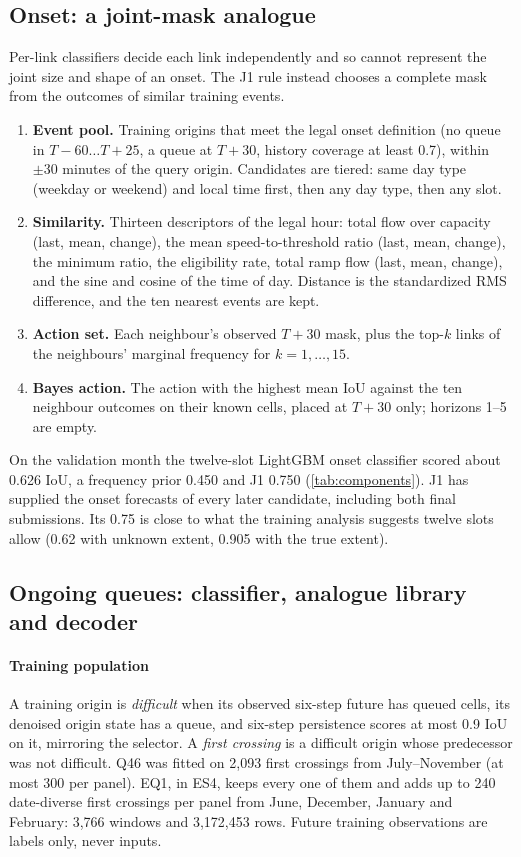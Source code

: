 \subsection{Onset: a joint-mask analogue}\label{sec:onset}
Per-link classifiers decide each link independently and so cannot represent the joint size and shape of an onset.
The J1 rule instead chooses a complete mask from the outcomes of similar training events.
\begin{enumerate}
  \item \textbf{Event pool.} Training origins that meet the legal onset definition (no queue in $T{-}60\dots T{+}25$,
        a queue at $T{+}30$, history coverage at least 0.7), within $\pm30$ minutes of the query origin. Candidates are
        tiered: same day type (weekday or weekend) and local time first, then any day type, then any slot.
  \item \textbf{Similarity.} Thirteen descriptors of the legal hour: total flow over capacity (last, mean, change), the
        mean speed-to-threshold ratio (last, mean, change), the minimum ratio, the eligibility rate, total ramp flow
        (last, mean, change), and the sine and cosine of the time of day. Distance is the standardized RMS difference,
        and the ten nearest events are kept.
  \item \textbf{Action set.} Each neighbour's observed $T{+}30$ mask, plus the top-$k$ links of the neighbours' marginal
        frequency for $k=1,\dots,15$.
  \item \textbf{Bayes action.} The action with the highest mean IoU against the ten neighbour outcomes on their known
        cells, placed at $T{+}30$ only; horizons 1--5 are empty.
\end{enumerate}
On the validation month the twelve-slot LightGBM onset classifier scored about 0.626 IoU, a frequency prior 0.450 and
J1 0.750 (\cref{tab:components}). J1 has supplied the onset forecasts of every later candidate, including both final
submissions. Its 0.75 is close to what the training analysis suggests twelve slots allow (0.62 with unknown extent,
0.905 with the true extent).

\subsection{Ongoing queues: classifier, analogue library and decoder}\label{sec:decoder}
\paragraph{Training population} A training origin is \emph{difficult} when its observed six-step future has queued
cells, its denoised origin state has a queue, and six-step persistence scores at most 0.9 IoU on it, mirroring the
selector. A \emph{first crossing} is a difficult origin whose predecessor was not difficult. Q46 was fitted on 2,093
first crossings from July--November (at most 300 per panel). EQ1, in ES4, keeps every one of them and adds up to 240
date-diverse first crossings per panel from June, December, January and February: 3,766 windows and 3,172,453 rows.
Future training observations are labels only, never inputs.

